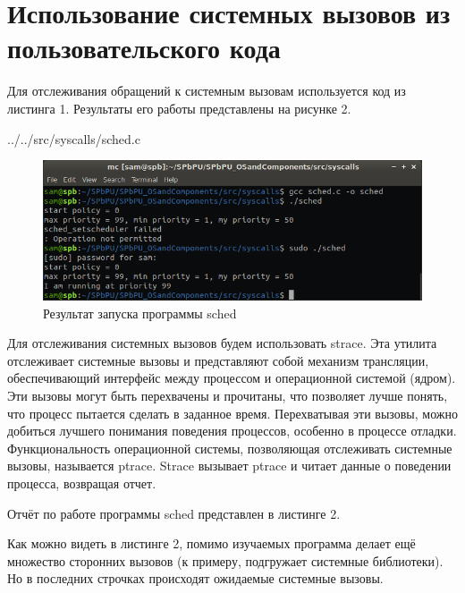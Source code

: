 \newpage
\section{Использование системных вызовов из пользовательского кода}

Для отслеживания обращений к системным вызовам используется код из листинга 1. Результаты его работы представлены на рисунке 2.


{../../src/syscalls/sched.c}

\begin{figure}[h!]
\centering
\includegraphics[scale=0.7]{res/pic002}
\caption{Результат запуска программы sched}
\end{figure}

Для отслеживания системных вызовов будем использовать strace. Эта утилита отслеживает системные вызовы и представляют собой механизм трансляции, обеспечивающий интерфейс между процессом и операционной системой (ядром). Эти вызовы могут быть перехвачены и прочитаны, что позволяет лучше понять, что процесс пытается сделать в заданное время. Перехватывая эти вызовы, можно добиться лучшего понимания поведения процессов, особенно в процессе отладки. Функциональность операционной системы, позволяющая отслеживать системные вызовы, называется ptrace. Strace вызывает ptrace и читает данные о поведении процесса, возвращая отчет.

Отчёт по работе программы sched представлен в листинге 2.



Как можно видеть в листинге 2, помимо изучаемых программа делает ещё множество сторонних вызовов (к примеру, подгружает системные библиотеки). Но в последних строчках происходят ожидаемые системные вызовы.